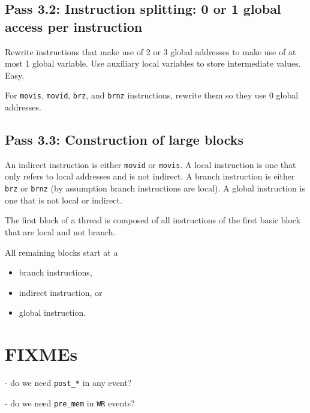 \documentclass{llncs}
\begin{document}
\subsection*{Pass 3.2: Instruction splitting: 0 or 1 global access per instruction}

Rewrite instructions that make use of 2 or 3 global addresses to make use of at
most 1 global variable.
Use auxiliary local variables to store intermediate values. Easy.

For \verb!movis!, \verb!movid!, \verb!brz!, and \verb!brnz! instructions,
rewrite them so they use 0 global addresses.

\subsection*{Pass 3.3: Construction of large blocks}

An indirect instruction is either \verb!movid! or \verb!movis!.
A local instruction is one that only refers to local addresses and is not
indirect.
A branch instruction is either
\verb!brz! or \verb!brnz! (by assumption branch instructions are local).
A global instruction is one that is not local or indirect.

The first block of a thread is composed of all instructions of the first basic
block that are local and not branch.

All remaining blocks start at a
\begin{itemize}
\item branch instructions,
\item indirect instruction, or
\item global instruction.
\end{itemize}

\section{FIXMEs}

- do we need \verb!post_*! in any event?

- do we need \verb!pre_mem! in \verb!WR! events?




\end{document}
